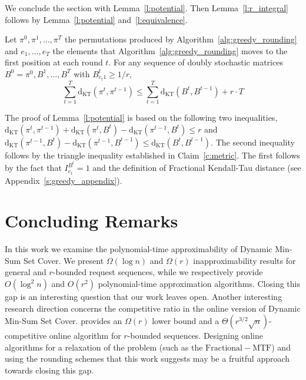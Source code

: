 \documentclass[a4paper,UKenglish,cleveref,autoref, thm-restate]{lipics-v2019}
\def\dkt{\mathrm{d}_{\mathrm{KT}}}
\begin{document}
\noindent We conclude the section with Lemma~\ref{l:potential}.
Then Lemma~\ref{l:r_integral} follows by Lemma~\ref{l:potential} 
and~\ref{l:equivalence}.%
\begin{lemma}\label{l:potential}
Let $\pi^0,\pi^1,\ldots,\pi^T$ the permutations produced by Algorithm~\ref{alg:greedy_rounding} and $e_1,\ldots,e_T$ the elements that Algorithm~\ref{alg:greedy_rounding} moves to the first position at each round $t$. For any sequence of doubly stochastic matrices $B^0 = \pi^0,B^1,\ldots,B^T$ with $B_{e_t 1}^t \geq 1/r$,
$$\sum_{t=1}^T \dkt(\pi^t,\pi^{t-1}) \leq \sum_{t=1}^T \dkt(B^t,B^{t-1}) + r \cdot T
$$
\end{lemma}
The proof of Lemma~\ref{l:potential} is based on the following two inequalities, $\dkt(\pi^t,\pi^{t-1}) + \dkt(\pi^t,B^t) - \dkt(\pi^{t-1},B^t) \leq r$ and $\dkt(\pi^{t-1},B^t) - \dkt(\pi^{t-1},B^{t-1}) \leq \dkt(B^t,B^{t-1})$. The second inequality follows by the triangle inequality established in Claim~\ref{c:metric}. The first follows by the fact that $I_{e_t}^{B^t} = 1$ and the definition of Fractional Kendall-Tau distance (see Appendix~\ref{s:greedy_appendix}).


\section{Concluding Remarks}
In this work we examine the polynomial-time approximability of Dynamic Min-Sum Set Cover. We present $\Omega(\log n)$ and $\Omega(r)$ inapproximability results for general and $r$-bounded request sequences, while we respectively provide $O(\log^2 n)$ and $O(r^2)$ polynomial-time approximation algorithms. Closing this gap is an interesting question that our work leaves open. Another interesting research direction concerns the competitive ratio in the online version of Dynamic Min-Sum Set Cover. 
\cite{FLPS20} provides an $\Omega(r)$ lower bound and a $\Theta\left(r^{3/2}\sqrt{n}\right)$-competitive online algorithm for $r$-bounded sequences. Designing online algorithms for a relaxation of the problem (such as the $\mathrm{Fractional}-\mathrm{MTF}$) and using the rounding schemes that this work suggests may be a fruitful approach towards closing this gap. 




%
%



\newpage
\clearpage


\appendix



\end{document}
